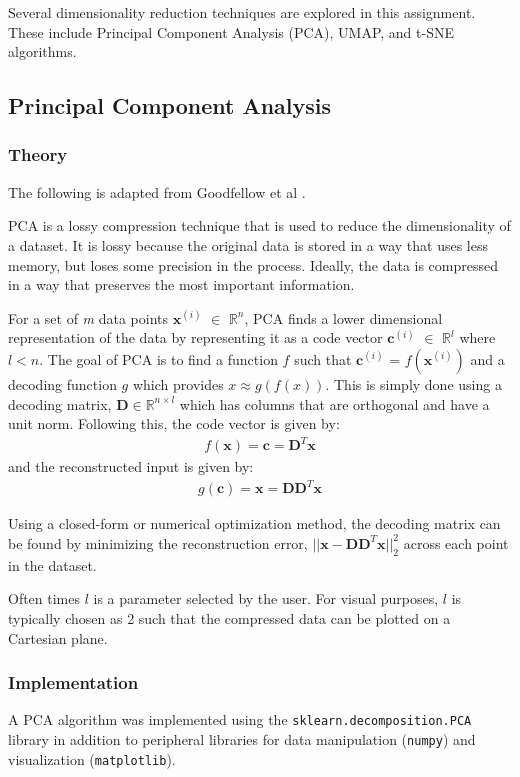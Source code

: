 \documentclass[12pt]{article}
\begin{document}
Several dimensionality reduction techniques are explored in this assignment. These include Principal Component Analysis (PCA), UMAP, and t-SNE algorithms.

\subsection{Principal Component Analysis}
\subsubsection{Theory}

The following is adapted from Goodfellow et al \cite{GoodBengCour16}.

PCA is a lossy compression technique that is used to reduce the dimensionality of a dataset. It is lossy because the original data is stored in a way that uses less memory, but loses some precision in the process. Ideally, the data is compressed in a way that preserves the most important information.

For a set of \textit{m} data points $\textbf{x}^{(i)}$ $\in$ $\mathbb{R}^n$, PCA finds a lower dimensional representation of the data by representing it as a code vector $\textbf{c}^{(i)}$ $\in$ $\mathbb{R}^l$ where $l < n$. The goal of PCA is to find a function $f$ such that $\textbf{c}^{(i)}$ = $f(\textbf{x}^{(i)})$ and a decoding function $g$ which provides $x \approx g(f(x))$. This is simply done using a decoding matrix, $\textbf{D} \in \mathbb{R}^{n \times l}$ which has columns that are orthogonal and have a unit norm. Following this, the code vector is given by:
\begin{align*}
        f(\textbf{x}) = \textbf{c} = \textbf{D}^T\textbf{x}
\end{align*}
and the reconstructed input is given by:
\begin{align*}
        g(\textbf{c}) = \textbf{x} = \textbf{D}\textbf{D}^T\textbf{x}
\end{align*} 

Using a closed-form or numerical optimization method, the decoding matrix can be found by minimizing the reconstruction error, $||\textbf{x} - \textbf{D}\textbf{D}^T\textbf{x}||_2^2$ across each point in the dataset.
 
Often times $l$ is a parameter selected by the user. For visual purposes, $l$ is typically chosen as 2 such that the compressed data can be plotted on a Cartesian plane.  

\subsubsection{Implementation}
A PCA algorithm was implemented using the \verb|sklearn.decomposition.PCA| library in addition to peripheral libraries for data manipulation (\verb|numpy|) and visualization (\verb|matplotlib|).
\end{document}
